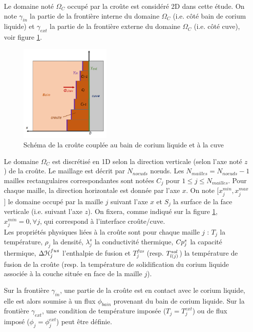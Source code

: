 Le domaine noté $\Omega_C$ occupé par la croûte est considéré 2D dans cette étude. On note $\gamma_{in}$ la partie de la frontière interne du domaine $\Omega_C$ (i.e. côté bain de corium liquide) et $\gamma_{ext}$ la partie de la frontière externe du domaine $\Omega_C$ (i.e. côté cuve), voir figure \ref{fig:crust_figure}. 

\begin{figure}[H]
\centering
\includegraphics[width=0.4\textwidth]{Figures/crust_figure.png}
\caption{Schéma de la croûte couplée au bain de corium liquide et à la cuve} \label{fig:crust_figure}
\end{figure}

Le domaine $\Omega_C$ est discrétisé en 1D selon la direction verticale (selon l'axe noté $z$) de la croûte. Le maillage est décrit par $N_{noeuds}$ n\oe{}uds. Les $N_{mailles}=N_{noeuds}-1$ mailles rectangulaires correspondantes sont notées $C_j$ pour $1 \leq j\leq N_{mailles}$. Pour chaque maille, la direction horizontale est donnée par l'axe $x$. On note [$x_j^{min}, x_j^{max}$] le domaine occupé par la maille $j$ suivant l'axe $x$ et $S_j$ la surface de la face verticale (i.e. suivant l'axe $z$). On fixera, comme indiqué sur la figure \ref{fig:crust_figure}, $x_j^{min}=0,\forall j$, qui correspond à l'interface croûte/cuve.\\

Les propriétés physiques liées à la croûte sont pour chaque maille $j$ : $T_j$ la température, $\rho_j$ la densité, $\lambda^s_j$ la conductivité thermique, $\heatCp[s]{j}$ la capacité thermique, $\Delta {\cal H}_j^{fus}$ l'enthalpie de fusion et $T_j^{fus}$ (resp. $\temperature[sol]{l(j)}$) la température de fusion de la croûte (resp. la température de solidification du corium liquide associée à la couche située en face de la maille $j$).

 Sur la frontière $\gamma_{in}$, une partie de la croûte est en contact avec le corium liquide, elle est alors soumise à un flux $\phi_{bain}$ provenant du bain de corium liquide. Sur la frontière $\gamma_{ext}$, une condition de température imposée ($T_j=T_j^{ext}$) ou de flux imposé ($\phi_j=\phi_j^{ext}$) peut être définie.\\
 
